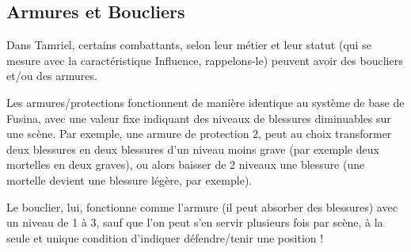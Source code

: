 
\subsection{Armures et Boucliers}

Dans Tamriel, certains combattants, selon leur métier et leur statut (qui se mesure avec la caractéristique Influence, rappelons-le) peuvent avoir des boucliers et/ou des armures.

Les armures/protections fonctionnent de manière identique au système de base de Fusina, avec une valeur fixe indiquant des niveaux de blessures diminuables sur une scène. Par exemple, une armure de protection 2, peut au choix transformer deux blessures en deux blessures d'un niveau moins grave (par exemple deux mortelles en deux graves), ou alors baisser de 2 niveaux une blessure (une mortelle devient une blessure légère, par exemple).

Le bouclier, lui, fonctionne comme l'armure (il peut absorber des blessures) avec un niveau de 1 à 3, sauf que l'on peut s'en servir plusieurs fois par scène, à la seule et unique condition d'indiquer défendre/tenir une position !